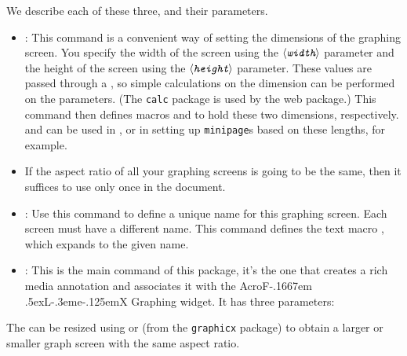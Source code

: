 \documentclass{article}
\makeatletter
\def\anglemeta#1{$\langle\textit{\texttt{#1}}\rangle$}
\let\meta\anglemeta
\let\pkg\textsf
\def\AcroFLeX{AcroF\kern-.1667em
    \lower.5ex\hbox{L}\kern-.3eme\kern-.125emX\@}
\let\amtIndent\leftmargini
\newenvironment{aebQuote}
   {\list{}{\leftmargin\amtIndent}%
    \item\relax}{\endlist}
\makeatother
\begin{document}
\CmdDescription We describe each of these three, and their parameters.
\begin{itemize}
  \item {}: This command is a convenient way of setting the dimensions
  of the graphing screen. You specify the width of the screen using the \meta{width}
  parameter and the height of the screen using the \meta{height} parameter. These values
  are passed through a , so simple calculations on the dimension can be performed
  on the parameters. (The \texttt{calc} package is used by the web package.) This command then
  defines macros  and  to hold these two dimensions, respectively.
   and  can be used in , or in setting up
  \texttt{minipage}s based on these lengths, for example.

  \item[] If the aspect ratio of all your graphing screens is going to be the same, then
  it suffices to use  only once in the document.

  \item {}: Use this command to define a unique name for this graphing screen. Each
  screen must have a different name. This command defines the text macro , which
  expands to the given name.

  \item {}: This is the main command of this package,
  it's the one that creates a rich media annotation and associates
  it with the {\AcroFLeX} Graphing widget. It has three parameters:
\end{itemize}
The  can be resized using  or
 (from the \texttt{graphicx} package) to obtain a
larger or smaller graph screen with the same aspect ratio.
\end{document}
